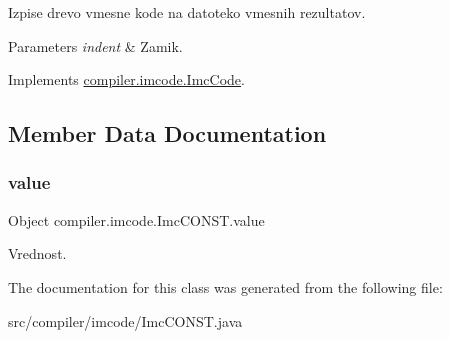 Izpise drevo vmesne kode na datoteko vmesnih rezultatov.


\begin{DoxyParams}{Parameters}
{\em indent} & Zamik. \\
\hline
\end{DoxyParams}


Implements \hyperlink{interfacecompiler_1_1imcode_1_1_imc_code_a26451dea2ab4dbd7054ac33f4c6d71fe}{compiler.\+imcode.\+Imc\+Code}.



\subsection{Member Data Documentation}
\mbox{\label{classcompiler_1_1imcode_1_1_imc_c_o_n_s_t_a9857b77242e0f1f89bd1e1d0251832bf}} 
\subsubsection{\texorpdfstring{value}{value}}
{\footnotesize\ttfamily Object compiler.\+imcode.\+Imc\+C\+O\+N\+S\+T.\+value}

Vrednost. 

The documentation for this class was generated from the following file\+:\begin{DoxyCompactItemize}
\item 
src/compiler/imcode/Imc\+C\+O\+N\+S\+T.\+java\end{DoxyCompactItemize}
